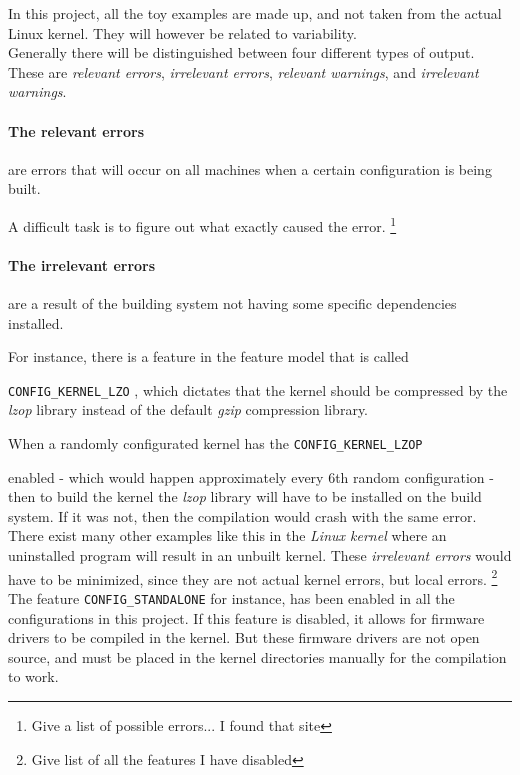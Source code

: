 \documentclass[a4paper,11pt]{article}
\newcommand{\textcode}[1]{
    \fboxsep=1pt
    \texttt{\colorbox{gray!20}{#1}}
}
\begin{document}
In this project, all the toy examples are made up, and not taken from the 
actual Linux kernel. They will however be related to variability. \\


Generally there will be distinguished between four different types of output. 
These are \emph{relevant errors}, \emph{irrelevant errors}, \emph{relevant 
warnings}, and \emph{irrelevant warnings}. 


\paragraph{The relevant errors} are errors that will occur on all machines 
when a certain configuration is being built. 

A difficult task is to figure out what exactly caused the error. 
\footnote{Give a list of possible errors... I found that site}


\paragraph{The irrelevant errors} 
are a result of the building system not having some specific dependencies 
installed. 

For instance, there is a feature in the feature model that is called 
\textcode{CONFIG\_KERNEL\_LZO}, which dictates that the kernel should be 
compressed by the \emph{lzop} library instead of the default \emph{gzip} 
compression library.

When a randomly configurated kernel has the \textcode{CONFIG\_KERNEL\_LZOP} 
enabled - which would happen approximately every 6th random configuration - 
then to build the kernel the \emph{lzop} library will have to be installed on 
the build system. If it was not, then the compilation would crash with the 
same error. \\ 


There exist many other examples like this in the \emph{Linux kernel} where an 
uninstalled program will result in an unbuilt kernel. These \emph{irrelevant 
errors} would have to be minimized, since they are not actual kernel errors, 
but local errors. \footnote{Give list of all the features I have disabled} 
\\

The feature \textcode{CONFIG\_STANDALONE} for instance, has been enabled in all 
the configurations in this project. If this feature is disabled, it allows for 
firmware drivers to be compiled in the kernel. But these firmware drivers are 
not open source, and must be placed in the kernel directories manually for the 
compilation to work.
\end{document}
